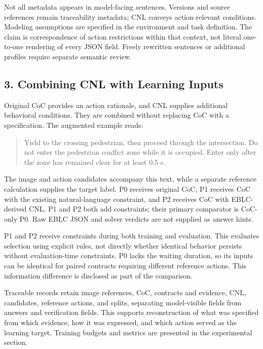 \documentclass[11pt,a4paper]{article}
\begin{document}
Not all metadata appears in model-facing sentences. Versions and source references remain traceability metadata; CNL conveys action-relevant conditions. Modeling assumptions are specified in the environment and task definition. The claim is correspondence of action restrictions within that context, not literal one-to-one rendering of every JSON field. Freely rewritten sentences or additional profiles require separate semantic review.\par

\subsection*{3. Combining CNL with Learning Inputs}

Original CoC provides an action rationale, and CNL supplies additional behavioral conditions. They are combined without replacing CoC with a specification. The augmented example reads:\par

\begin{quote}Yield to the crossing pedestrian, then proceed through the intersection. Do not enter the pedestrian conflict zone while it is occupied. Enter only after the zone has remained clear for at least 0.5 s.\end{quote}

The image and action candidates accompany this text, while a separate reference calculation supplies the target label. P0 receives original CoC, P1 receives CoC with the existing natural-language constraint, and P2 receives CoC with EBLC-derived CNL. P1 and P2 both add constraints; their primary comparator is CoC-only P0. Raw EBLC JSON and solver verdicts are not supplied as answer hints.\par

P1 and P2 receive constraints during both training and evaluation. This evaluates selection using explicit rules, not directly whether identical behavior persists without evaluation-time constraints. P0 lacks the waiting duration, so its inputs can be identical for paired contracts requiring different reference actions. This information difference is disclosed as part of the comparison.\par

Traceable records retain image references, CoC, contracts and evidence, CNL, candidates, reference actions, and splits, separating model-visible fields from answers and verification fields. This supports reconstruction of what was specified from which evidence, how it was expressed, and which action served as the learning target. Training budgets and metrics are presented in the experimental section.\par
\end{document}
